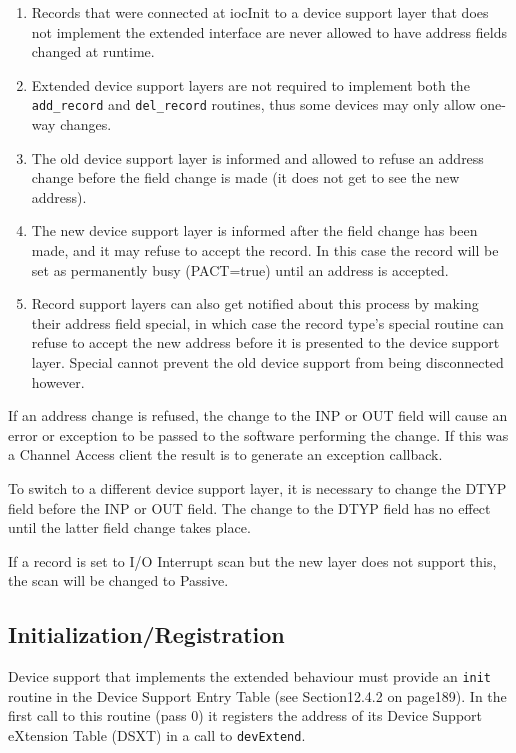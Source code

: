 \begin{enumerate}\item Records that were connected at iocInit to a device support layer that does not implement the extended interface are 
never allowed to have address fields changed at runtime.

\item Extended device support layers are not required to implement both the \verb|add_record| and \verb|del_record| routines, 
thus some devices may only allow one-way changes.

\item The old device support layer is informed and allowed to refuse an address change before the field change is made 
(it does not get to see the new address).

\item The new device support layer is informed after the field change has been made, and it may refuse to accept the 
record.  In this case the record will be set as permanently busy (PACT=true) until an address is accepted.

\item Record support layers can also get notified about this process by making their address field special, in which case 
the record type's special routine can refuse to accept the new address before it is presented to the device support 
layer. Special cannot prevent the old device support from being disconnected however.

\end{enumerate}If an address change is refused, the change to the INP or OUT field will cause an error or exception to be passed to the 
software performing the change. If this was a Channel Access client the result is to generate an exception callback.

To switch to a different device support layer, it is necessary to change the DTYP field before the INP or OUT field. The 
change to the DTYP field has no effect until the latter field change takes place.

If a record is set to I/O Interrupt scan but the new layer does not support this, the scan will be changed to Passive.

\subsection{Initialization/Registration}

Device support that implements the extended behaviour must provide an \verb|init| routine in the Device Support Entry Table 
(see Section12.4.2 on page189).   In the first call to this routine (pass 0) it registers the address of its Device Support 
eXtension Table (DSXT) in a call to \verb|devExtend|.

